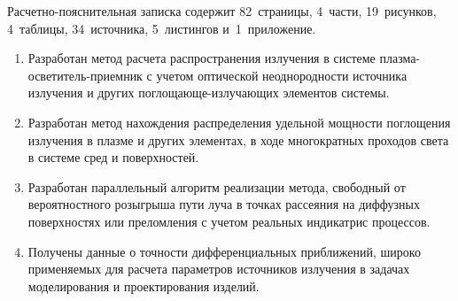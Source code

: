 

Расчетно-пояснительная записка содержит 82~страницы, 4~части, 19~рисунков, 4~таблицы, 34~источника, 5~листингов и~1~приложение.


\begin{enumerate}
	\item Разработан метод расчета распространения излучения в системе плазма-осветитель-приемник с учетом оптической неоднородности источника излучения и других поглощающе-излучающих элементов системы.

	\item Разработан метод нахождения распределения удельной мощности поглощения излучения в плазме и других элементах, в ходе многократных проходов света в системе сред и поверхностей.

	\item Разработан параллельный алгоритм реализации метода, свободный от вероятностного розыгрыша пути луча в точках рассеяния на диффузных поверхностях или преломления с учетом реальных индикатрис процессов.

	\item Получены данные о точности дифференциальных приближений, широко применяемых для расчета параметров источников излучения в задачах моделирования и проектирования изделий.
\end{enumerate}
